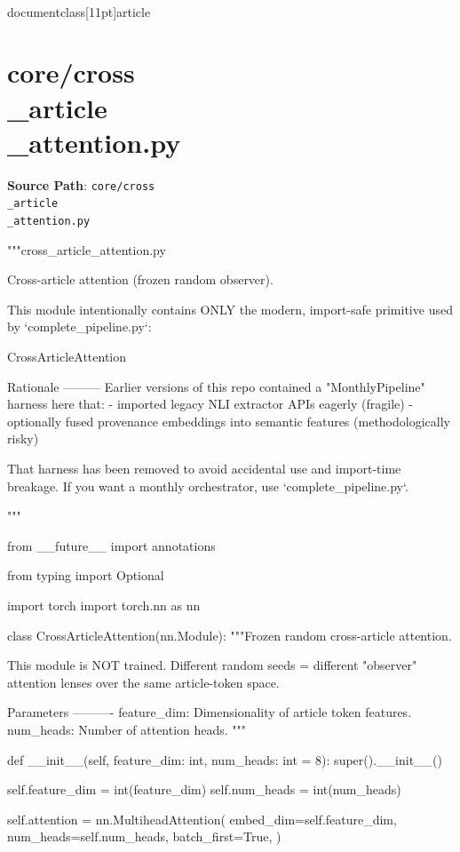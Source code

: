 \\documentclass[11pt]{article}
\begin{document}
\section*{core/cross\\_article\\_attention.py}
\textbf{Source Path}: \texttt{core/cross\\_article\\_attention.py}\par
\bigskip
\begin{CodeBlock}
"""cross_article_attention.py

Cross-article attention (frozen random observer).

This module intentionally contains ONLY the modern, import-safe primitive used by
`complete_pipeline.py`:

    CrossArticleAttention

Rationale
---------
Earlier versions of this repo contained a "MonthlyPipeline" harness here that:
- imported legacy NLI extractor APIs eagerly (fragile)
- optionally fused provenance embeddings into semantic features (methodologically risky)

That harness has been removed to avoid accidental use and import-time breakage.
If you want a monthly orchestrator, use `complete_pipeline.py`.

"""

from __future__ import annotations

from typing import Optional

import torch
import torch.nn as nn


class CrossArticleAttention(nn.Module):
    """Frozen random cross-article attention.

    This module is NOT trained. Different random seeds = different "observer"
    attention lenses over the same article-token space.

    Parameters
    ----------
    feature_dim:
        Dimensionality of article token features.
    num_heads:
        Number of attention heads.
    """

    def __init__(self, feature_dim: int, num_heads: int = 8):
        super().__init__()

        self.feature_dim = int(feature_dim)
        self.num_heads = int(num_heads)

        self.attention = nn.MultiheadAttention(
            embed_dim=self.feature_dim,
            num_heads=self.num_heads,
            batch_first=True,
        )


\end{CodeBlock}
\end{document}
